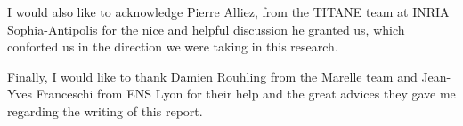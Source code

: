 \documentclass[a4paper,10pt]{article}
\begin{document}
I would also like to acknowledge Pierre Alliez, from the TITANE team at INRIA Sophia-Antipolis for the nice and helpful discussion he granted us, which conforted us in the direction we were taking in this research.

Finally, I would like to thank Damien Rouhling from the Marelle team and Jean-Yves Franceschi from ENS Lyon for their help and the great advices they gave me regarding the writing of this report.

\newpage


\end{document}
